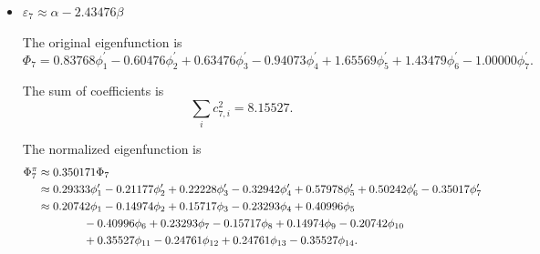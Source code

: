 \begin{itemize}
		
		\item $\varepsilon_7 \approx \alpha -2.43476 \beta$
		
		The original eigenfunction is
		\begin{equation*}
			\Phi_7 = 0.83768 \phi^\prime_1 - 0.60476 \phi^\prime_2 +0.63476 \phi^\prime_3 - 0.94073 \phi^\prime_4 + 1.65569 \phi^\prime_5 + 1.43479 \phi^\prime_6 - 1.00000 \phi^\prime_7.
		\end{equation*}
		
		The sum of coefficients is
		\begin{equation*}
			\sum_{i} c^2_{7,i} = 8.15527.
		\end{equation*}
		
		The normalized eigenfunction is
		\begin{align}
			\Phi^\pi_7 &\approx 0.350171 \Phi_7 \notag \\
			&\approx 0.29333 \phi^\prime_1 - 0.21177 \phi^\prime_2 +0.22228 \phi^\prime_3 -0.32942 \phi^\prime_4 + 0.57978 \phi^\prime_5 + 0.50242 \phi^\prime_6 - 0.35017 \phi^\prime_7 \notag \\
			&\approx 0.20742 \phi_1 -0.14974 \phi_2 + 0.15717 \phi_3 -0.23293\phi_4 + 0.40996\phi_5  \notag \\
			&\hspace*{4em} -0.40996 \phi_6 +0.23293\phi_7 - 0.15717\phi_8 +0.14974 \phi_9 -0.20742 \phi_{10} \notag \\
			&\hspace*{4em} +0.35527 \phi_{11} -0.24761 \phi_{12} +0.24761 \phi_{13} -0.35527  \phi_{14} .
		\end{align}
		
		\end{itemize}
		
